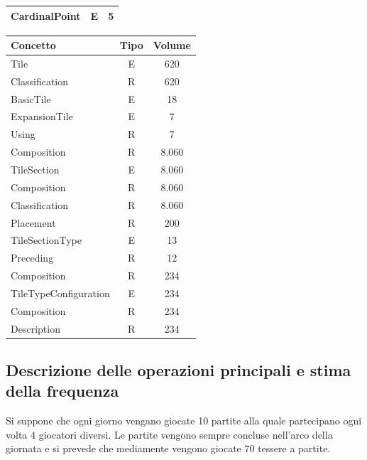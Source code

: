 {\begin{tabular}{ |l|c|c| }
CardinalPoint & E & 5 \\
\hline
\end{tabular}
\begin{tabular}{ |l|c|c| }
\hline
\textbf{Concetto} & \textbf{Tipo} & \textbf{Volume} \\
\hline
Tile & E & 620 \\
Classification & R & 620 \\
BasicTile & E & 18 \\
ExpansionTile & E & 7 \\
Using & R & 7 \\
Composition & R & 8.060 \\
\hline
TileSection & E & 8.060 \\
Composition & R & 8.060 \\
Classification & R & 8.060 \\
Placement & R & 200 \\
TileSectionType & E & 13 \\
Preceding & R & 12 \\
Composition & R & 234 \\
\hline
TileTypeConfiguration & E & 234 \\
Composition & R & 234 \\
Description & R & 234 \\
\hline
\end{tabular}}
\subsection{Descrizione delle operazioni principali e stima della frequenza}
Si suppone che ogni giorno vengano giocate 10 partite alla quale partecipano ogni volta 4 giocatori diversi. Le partite vengono sempre concluse nell'arco della giornata e si prevede che mediamente vengono giocate 70 tessere a partite.
\medskip


